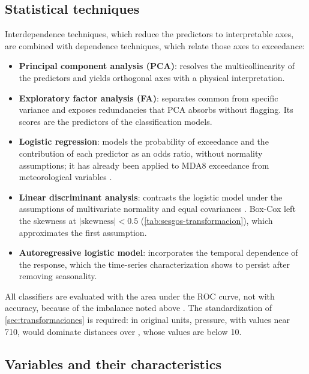 \subsection{Statistical techniques}
\label{sec:obj:tecnicas}

Interdependence techniques, which reduce the predictors to interpretable
axes, are combined with dependence techniques, which relate those axes to
exceedance:

\begin{itemize}
  \item \textbf{Principal component analysis (PCA)}: resolves the
    multicollinearity of the predictors and yields orthogonal axes with a
    physical interpretation.
  \item \textbf{Exploratory factor analysis (FA)}: separates common from
    specific variance and exposes redundancies that PCA absorbs without
    flagging. Its scores are the predictors of the classification models.
  \item \textbf{Logistic regression}: models the probability of exceedance
    and the contribution of each predictor as an odds ratio, without
    normality assumptions; it has already been applied to MDA8 exceedance
    from meteorological variables \parencite{otero2016}.
  \item \textbf{Linear discriminant analysis}: contrasts the logistic model
    under the assumptions of multivariate normality and equal covariances
    \parencite{hosmer2013}. Box-Cox left the skewness at
    $|\text{skewness}|<0.5$ (\cref{tab:sesgos-transformacion}), which
    approximates the first assumption.
  \item \textbf{Autoregressive logistic model}: incorporates the temporal
    dependence of the response, which the time-series characterization shows
    to persist after removing seasonality.
\end{itemize}

All classifiers are evaluated with the area under the ROC curve, not with
accuracy, because of the imbalance noted above \parencite{saito2015}. The
standardization of \cref{sec:transformaciones} is required: in original
units, pressure, with values near 710, would dominate distances over
, whose values are below 10.

\subsection{Variables and their characteristics}
\label{sec:obj:variables}

